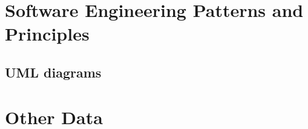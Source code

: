 \documentclass{report}
\begin{document}



\begin{appendices}
\chapter{Software Engineering Patterns and Principles}	
	\section{UML diagrams}
\chapter{Other Data}
	
\end{appendices}
\end{document}
